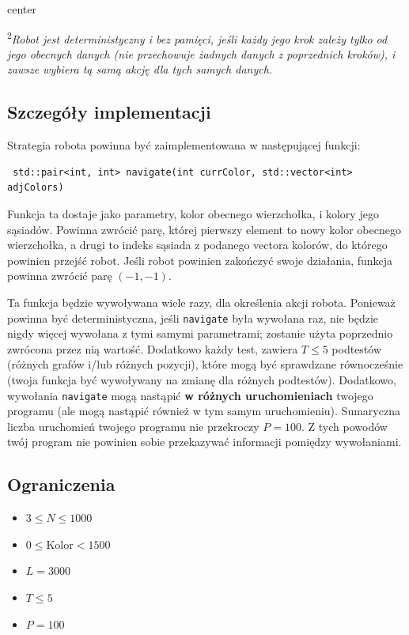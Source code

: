 \documentclass[12pt]{article}
\begin{document}
\begin{adjustbox}{center}
	
\end{adjustbox}

\textsuperscript{2}\textit{Robot jest deterministyczny i bez pamięci, jeśli każdy jego krok zależy tylko od jego obecnych danych (nie przechowuje żadnych danych z poprzednich kroków), i zawsze wybiera tą samą akcję dla tych samych danych.}

\subsection{Szczegóły implementacji}
Strategia robota powinna być zaimplementowana w następującej funkcji:
\begin{lstlisting}
 std::pair<int, int> navigate(int currColor, std::vector<int> adjColors)
\end{lstlisting}

Funkcja ta dostaje jako parametry, kolor obecnego wierzchołka, i kolory jego sąsiadów. Powinna zwrócić parę, której pierwszy element to nowy kolor obecnego wierzchołka, a drugi to indeks sąsiada z podanego vectora kolorów, do którego powinien przejść robot. Jeśli robot powinien zakończyć swoje działania, funkcja powinna zwrócić parę $(-1, -1)$.

Ta funkcja będzie wywoływana wiele razy, dla określenia akcji robota. Ponieważ powinna być deterministyczna, jeśli \texttt{navigate} była wywołana raz, nie będzie nigdy więcej wywołana z tymi samymi parametrami; zostanie użyta poprzednio zwrócona przez nią wartość. Dodatkowo każdy test, zawiera $T \leq 5$ podtestów (różnych grafów i/lub różnych pozycji), które mogą być sprawdzane równocześnie (twoja funkcja być wywoływany na zmianę dla różnych podtestów). Dodatkowo, wywołania \texttt{navigate} mogą nastąpić \textbf{w różnych uruchomieniach} twojego programu (ale mogą nastąpić również w tym samym uruchomieniu). Sumaryczna liczba uruchomień twojego programu nie przekroczy $P = 100$. Z tych powodów twój program nie powinien sobie przekazywać informacji pomiędzy wywołaniami.

\subsection{Ograniczenia}

\begin{itemize}
\item $3 \leq N \leq 1000$
\item $0 \leq \mathrm{Kolor} < 1500$
\item $L = 3000$
\item $T \leq 5$
\item $P = 100$
\end{itemize}
\end{document}
